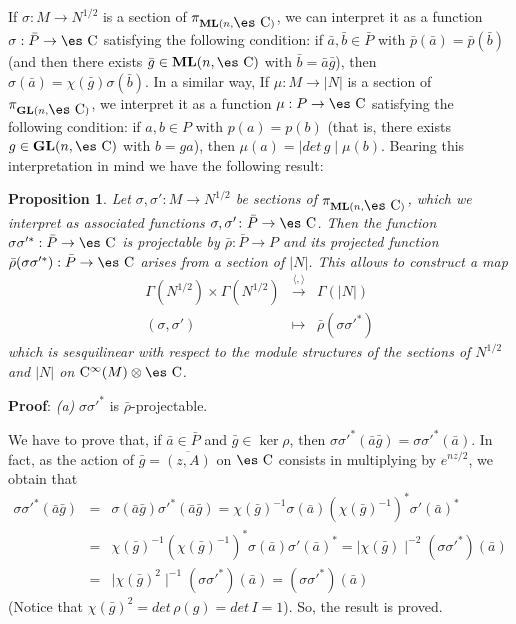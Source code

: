 \documentclass[12pt]{article}
\newtheorem{prop}{Proposition}
\def\beann{\begin{eqnarray*}}
\def\eeann{\end{eqnarray*}}
\def\mapping#1{\mathrel{\mathop{\longrightarrow}\limits^{#1}}}
\def\GL{{\bf GL}(n,\Complex )}
\def\ML{{\bf ML}(n,\Complex )}
\def\Complex{\mbox{\es C}}
\def\Cinfty{{\rm C}^\infty}
\begin{document}
If $\sigma : M \to N^{1/2}$ is a section of $\pi_{\ML}$, we can
interpret it as a function $\sigma : \bar P \to \Complex$
satisfying the following condition: if $\bar a, \bar b \in \bar P$
with $\bar p (\bar a) = \bar p (\bar b)$ (and then there exists
$\bar g \in \ML$ with $\bar b = \bar a \bar g$), then $\sigma
(\bar a) = \chi (\bar g) \sigma (\bar b)$. In a similar way, If
$\mu : M \to | N |$ is a section of $\pi_{\GL}$, we interpret it
as a function $\mu : P \to \Complex$ satisfying the following
condition: if $a,b \in P$ with $p(a) = p(b)$ (that is, there
exists $g \in \GL$ with $b=ga$), then $\mu (a) = \mid det\, g \mid
\mu (b)$. Bearing this interpretation in mind we have the
following result:

\begin{prop}
Let $\sigma ,\sigma '\colon M \to N^{1/2}$ be sections of
$\pi_{\ML}$, which we interpret as associated functions $\sigma
,\sigma ' \colon\bar P \to \Complex$. Then the function $\sigma
\sigma '^* : \bar P \to \Complex$ is projectable by $\bar \rho :
\bar P \to P$ and its projected function $\bar \rho (\sigma \sigma
'^*) : \bar P \to \Complex$ arises from a section of $| N |$. This
allows to construct a map $$
\begin{array}{ccc}
\Gamma (N^{1/2}) \times \Gamma (N^{1/2})
& \mapping{\langle , \rangle} &
\Gamma (| N |)
\\
(\sigma ,\sigma ') & \mapsto & \bar \rho (\sigma \sigma '^*)
\end{array}
$$
which is sesquilinear with respect to the module structures of the
sections of
$N^{1/2}$ and $| N |$ on $\Cinfty(M)\otimes\Complex$.
\label{propi1}
\end{prop}
{\bf Proof}: 
{\it (a)} \quad
$\sigma \sigma '^*$ is $\bar \rho$-projectable.

We have to prove that, if $\bar a \in \bar P$ and $\bar g \in \ker
\rho$, then
$\sigma \sigma '^*(\bar a \bar g) = \sigma \sigma '^*(\bar a)$.
In fact, as the action of $\bar g = \overline{(z,A)}$ on $\Complex$
consists in multiplying by
$e^{nz/2}$, we obtain that
\beann
\sigma \sigma '^*(\bar a \bar g)
& = &
\sigma (\bar a \bar g) \sigma '^*(\bar a \bar g) =
\chi (\bar g)^{-1} \sigma (\bar a)
(\chi (\bar g)^{-1})^* \sigma '(\bar a)^*
\\
& = &
\chi (\bar g)^{-1} (\chi (\bar g)^{-1})^*
\sigma (\bar a) \sigma '(\bar a)^* =
\mid \chi (\bar g) \mid ^{-2} (\sigma \sigma '^*)(\bar a) \\
&=&
\mid \chi (\bar g)^2 \mid ^{-1} (\sigma \sigma '^*)(\bar a)=
(\sigma{\sigma '}^*)(\bar a)
\eeann
(Notice that $\chi (\bar g)^2 = det\, \rho (g) = det\, I = 1$).
So, the result is proved.
\end{document}
